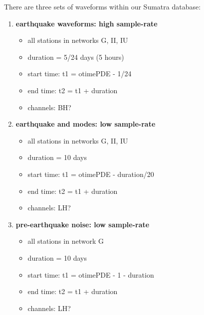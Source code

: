 \documentclass[11pt,titlepage,fleqn]{article}
\begin{document}
\bigskip\noindent
There are three sets of waveforms within our Sumatra database:
%
\begin{enumerate}
\item {\bf earthquake waveforms: high sample-rate}
\begin{itemize}
\item all stations in networks G, II, IU
\item duration = 5/24 days (5 hours)
\item start time: t1 = otimePDE - 1/24
\item end time: t2 = t1 + duration
\item channels: BH?
\end{itemize}

\item {\bf earthquake and modes: low sample-rate}
\begin{itemize}
\item all stations in networks G, II, IU
\item duration = 10 days
\item start time: t1 = otimePDE - duration/20
\item end time: t2 = t1 + duration
\item channels: LH?
\end{itemize}

\item {\bf pre-earthquake noise: low sample-rate}
\begin{itemize}
\item all stations in network G
\item duration = 10 days
\item start time: t1 = otimePDE - 1 - duration
\item end time: t2 = t1 + duration
\item channels: LH?
\end{itemize}

\end{enumerate}
\end{document}
